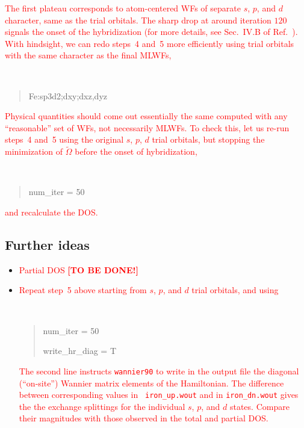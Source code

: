 \documentclass[a4paper,11pt,twoside]{article}
\def\tent#1{\textcolor{red}{#1}}     %
\begin{document}
\tent{The first plateau corresponds to atom-centered WFs of separate
  $s$, $p$, and $d$ character, same as the trial orbitals. The
  sharp drop at around iteration $120$ signals the onset of the
  hybridization (for more details, see Sec.~IV.B of
  Ref.~\cite{wang-prb06}).  With hindsight, we can redo steps~4 and~5
  more efficiently using trial orbitals with the same character as the
  final MLWFs,} {\tt
\begin{quote}
Fe:sp3d2;dxy;dxz,dyz
\end{quote}
}


\tent{Physical quantities should come out essentially the same
  computed with any ``reasonable'' set of WFs, not necessarily MLWFs.
  To check this, let us re-run steps~4 and~5 using the original $s$,
  $p$, $d$ trial orbitals, but stopping the minimization of
  $\widetilde{\Omega}$ before the onset of hybridization,} {\tt
\begin{quote}
num\_iter = 50
\end{quote}
}

\tent{and recalculate the DOS.}


\subsection*{Further ideas}
\begin{itemize}

\item \tent{Partial DOS {\bf [TO BE DONE!]}}

\item
\tent{Repeat step~5 above starting from $s$,
  $p$, and $d$ trial orbitals, and using}
{\tt
\begin{quote}
num\_iter = 50

write\_hr\_diag = T
\end{quote}
}

\tent{The second line instructs {\tt wannier90} to write in the output
  file the diagonal (``on-site'') Wannier matrix elements of the
  Hamiltonian. The difference between corresponding values in {\tt
    iron\_up.wout} and in {\tt iron\_dn.wout} gives the the exchange
  splittings for the individual $s$, $p$, and $d$ states. Compare
  their magnitudes with those observed in the total and partial DOS.}

\end{itemize}

\cleardoublepage
\end{document}
